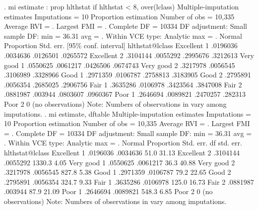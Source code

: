 . mi estimate : prop hlthstat if hlthstat < 8, over(lclass) 
{\smallskip}
Multiple-imputation estimates     Imputations     =         10
Proportion estimation             Number of obs   =     10,335
                                  Average RVI     =          .
                                  Largest FMI     =          .
                                  Complete DF     =      10334
DF adjustment:   Small sample     DF:     min     =      36.31
                                          avg     =          .
Within VCE type:     Analytic             max     =          .
{\smallskip}
                {\VBAR}                                   Normal
                {\VBAR} Proportion   Std. err.     [95\% conf. interval]
hlthstat@lclass {\VBAR}
   Excellent 1  {\VBAR}   .0196036   .0034636      .0126501    .0265572
   Excellent 2  {\VBAR}   .3104144   .0055292      .2995676    .3212613
   Very good 1  {\VBAR}   .0550625   .0061217      .0426506    .0674743
   Very good 2  {\VBAR}   .3217978   .0056545      .3106989    .3328966
        Good 1  {\VBAR}   .2971359   .0106787      .2758813    .3183905
        Good 2  {\VBAR}   .2795891   .0056354      .2685025    .2906756
        Fair 1  {\VBAR}   .3635286   .0106978      .3423564    .3847008
        Fair 2  {\VBAR}   .0881987    .003944      .0803607    .0960367
        Poor 1  {\VBAR}   .2646694   .0089821      .2470257     .282313
        Poor 2  {\VBAR}          0  (no observations)
Note: Numbers of observations in {} vary among imputations.
{\smallskip}
. mi estimate, dftable
{\smallskip}
Multiple-imputation estimates     Imputations     =         10
Proportion estimation             Number of obs   =     10,335
                                  Average RVI     =          .
                                  Largest FMI     =          .
                                  Complete DF     =      10334
DF adjustment:   Small sample     DF:     min     =      36.31
                                          avg     =          .
Within VCE type:     Analytic             max     =          .
{\smallskip}
                {\VBAR}                                          Normal
                {\VBAR} Proportion   Std. err.           df   std. err.
hlthstat@lclass {\VBAR}
   Excellent 1  {\VBAR}   .0196036   .0034636          51.0       31.13
   Excellent 2  {\VBAR}   .3104144   .0055292        1330.3        4.05
   Very good 1  {\VBAR}   .0550625   .0061217          36.3       40.88
   Very good 2  {\VBAR}   .3217978   .0056545         827.8        5.38
        Good 1  {\VBAR}   .2971359   .0106787          79.2       22.65
        Good 2  {\VBAR}   .2795891   .0056354         324.7        9.33
        Fair 1  {\VBAR}   .3635286   .0106978         125.0       16.73
        Fair 2  {\VBAR}   .0881987    .003944          87.9       21.09
        Poor 1  {\VBAR}   .2646694   .0089821         548.3        6.85
        Poor 2  {\VBAR}          0  (no observations)
Note: Numbers of observations in {} vary among imputations.
